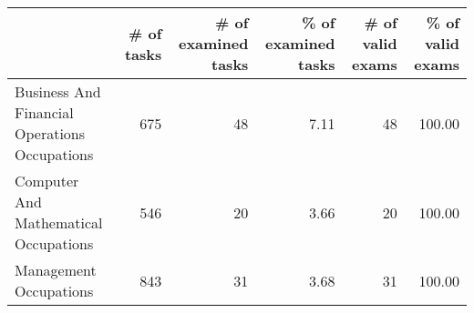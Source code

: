 \begin{tabular}{lrrrrr}
\toprule
 & \# of tasks & \# of examined tasks & \% of examined tasks & \# of valid exams & \% of valid exams \\
\midrule
Business And Financial Operations Occupations & 675 & 48 & 7.11 & 48 & 100.00 \\
Computer And Mathematical Occupations & 546 & 20 & 3.66 & 20 & 100.00 \\
Management Occupations & 843 & 31 & 3.68 & 31 & 100.00 \\
\bottomrule
\end{tabular}
